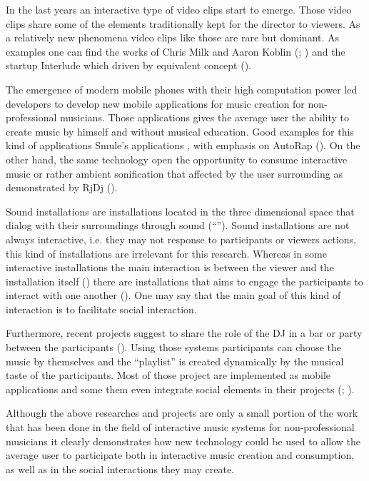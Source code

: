 In the last years an interactive type of video clips start to emerge. Those video clips share some of the elements traditionally kept for the director to viewers. As a relatively new phenomena video clips like those are rare but dominant. As examples one can find the works of Chris Milk and Aaron Koblin (\cite{web:milk1}; \cite{web:milk2}) and the startup Interlude which driven by equivalent concept (\cite{web:interlude}).

The emergence of modern mobile phones with their high computation power led developers to develop new mobile applications for music creation for non-professional musicians. Those applications gives the average user the ability to create music by himself and without musical education. Good examples for this kind of applications Smule's applications , with emphasis on AutoRap (\cite{web:autorap}). On the other hand, the same technology open the opportunity to consume interactive music or rather ambient sonification that affected by the user surrounding as demonstrated by RjDj (\cite{web:rjdj}).

Sound installations are installations located in the three dimensional space that dialog with their surroundings through sound (``''). Sound installations are not always interactive, i.e. they may not response to participants or viewers actions, this kind of installations are irrelevant for this research. Whereas in some interactive installations the main interaction is between the viewer and the installation itself (\cite{web:visnjic}) there are installations that aims to engage the participants to interact with one another (\cite{eng03}). One may say that the main goal of this kind of interaction is to facilitate social interaction.

Furthermore, recent projects suggest to share the role of the DJ in a bar or party between the participants (\cite{web:shaw}). Using those systems participants can choose the music by themselves and the ``playlist'' is created dynamically by the musical taste of the participants. Most of those project are implemented as mobile applications and some them even integrate social elements in their projects (\cite{web:playmysong}; \cite{web:lammers}).

Although the above researches and projects are only a small portion of the work that has been done in the field of interactive music systems for non-professional musicians it clearly demonstrates how new technology could be used to allow the average user to participate both in interactive music creation and consumption, as well as in the social interactions they may create.

